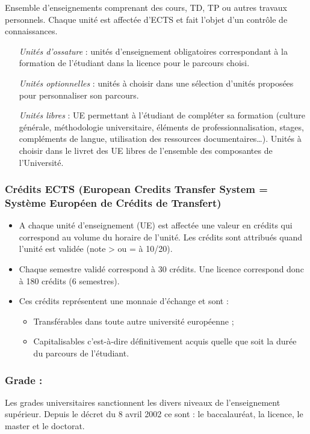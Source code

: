 \documentclass[10pt, a5paper]{report}
\begin{document}
\begin{spacing}{1.5}
Ensemble d’enseignements comprenant des cours, TD, TP ou autres travaux personnels. Chaque unité est affectée d’ECTS et fait l’objet d’un contrôle de connaissances.
\begin{itemize}
\item[\textit{Unités d’ossature}] : unités d’enseignement obligatoires correspondant à la formation de l’étudiant dans la licence  pour le parcours choisi.
\item[\textit{Unités optionnelles}] : unités à choisir dans une sélection d’unités proposées pour personnaliser son parcours.
\item[\textit{Unités libres}] : UE permettant à l’étudiant de compléter sa formation (culture générale, méthodologie universitaire, éléments de professionnalisation, stages, compléments de langue, utilisation des ressources documentaires…). Unités à choisir dans le livret des UE libres de l’ensemble des composantes de l’Université.
\end{itemize}

\subsubsection*{Crédits ECTS (European Credits Transfer System = Système Européen de Crédits de Transfert)}

\begin{itemize}
\item A chaque unité d’enseignement (UE) est affectée une valeur en crédits qui correspond au volume du horaire de l’unité. Les crédits sont attribués quand l’unité est validée (note > ou = à 10/20).
\item Chaque semestre validé correspond à 30 crédits. Une licence correspond donc à 180 crédits (6 semestres).
\item Ces crédits représentent une monnaie d’échange et sont : 
\begin{itemize}
\item Transférables dans toute autre université européenne ;
\item Capitalisables c’est-à-dire définitivement acquis quelle que soit la durée du parcours de l’étudiant. 
\end{itemize}
\end{itemize}

\subsubsection*{Grade :}

Les grades universitaires sanctionnent les divers niveaux de l’enseignement supérieur. Depuis le décret du 8 avril 2002 ce sont : le baccalauréat, la licence, le master et le doctorat.


\end{spacing}
\end{document}
